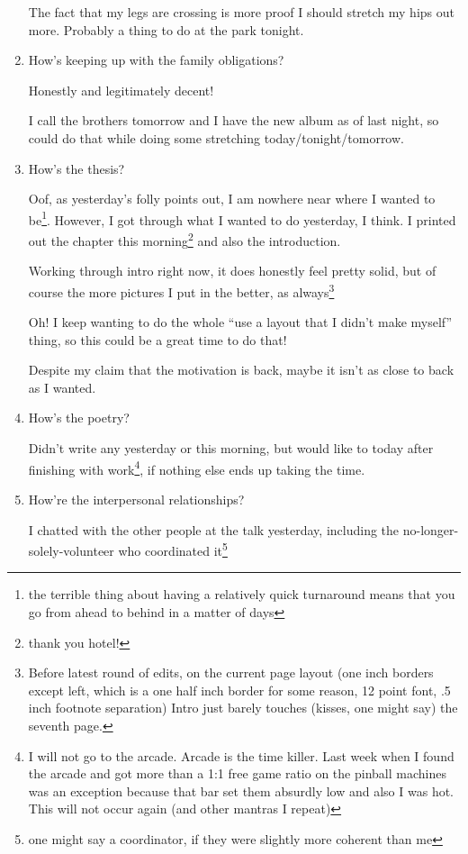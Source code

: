 \documentclass[12pt]{article}
\newcommand{\say}[1]{``#1''}
\renewcommand{\,}{\textsuperscript{,}}
\begin{document}
\begin{enumerate}
The fact that my legs are crossing is more proof I should stretch my hips out more.  
Probably a thing to do at the park tonight.

\item How's keeping up with the family obligations?

Honestly and legitimately decent!

I call the brothers tomorrow and I have the new album as of last night, so could do that while doing some stretching today/tonight/tomorrow.

\item How's the thesis?

Oof, as yesterday's folly points out, I am nowhere near where I wanted to be\footnote{the terrible thing about having a relatively quick turnaround means that you go from ahead to behind in a matter of days}.  
However, I got through what I wanted to do yesterday, I think.  
I printed out the chapter this morning\footnote{thank you hotel!} and also the introduction.

Working through intro right now, it does honestly feel pretty solid, but of course the more pictures I put in the better, as always\footnote{Before latest round of edits, on the current page layout (one inch borders except left, which is a one half inch border for some reason, 12 point font, .5 inch footnote separation) Intro just barely touches (kisses, one might say) the seventh page.}

Oh! I keep wanting to do the whole \say{use a layout that I didn't make myself} thing, so this could be a great time to do that!

Despite my claim that the motivation is back, maybe it isn't as close to back as I wanted.

\item How's the poetry?

Didn't write any yesterday or this morning, but would like to today after finishing with work\footnote{I will not go to the arcade. Arcade is the time killer. Last week when I found the arcade and got more than a 1:1 free game ratio on the pinball machines was an exception because that bar set them absurdly low and also I was hot. This will not occur again (and other mantras I repeat)}, if nothing else ends up taking the time.

\item How're the interpersonal relationships?

I chatted with the other people at the talk yesterday, including the no-longer-solely-volunteer who coordinated it\footnote{one might say a coordinator, if they were slightly more coherent than me}


\end{enumerate}
\end{document}
